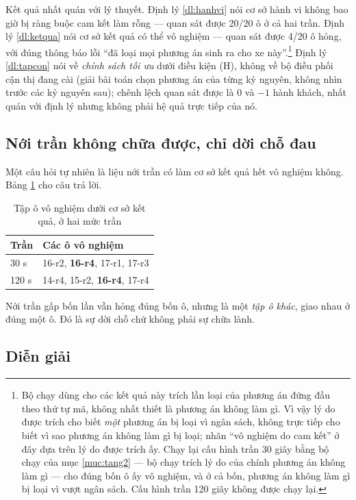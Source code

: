 Kết quả nhất quán với lý thuyết. Định lý \ref{dl:hanhvi} nói cơ sở hành vi không bao giờ bị
ràng buộc cam kết làm rỗng --- quan sát được 20/20 ô ở cả hai trần. Định lý \ref{dl:ketqua} nói
cơ sở kết quả có thể vô nghiệm --- quan sát được 4/20 ô hỏng, với đúng thông báo lỗi ``đã loại
mọi phương án sinh ra cho xe này''.\footnote{Bộ chạy dùng cho các kết quả này trích lần loại của
phương án đứng đầu theo thứ tự mã, không nhất thiết là phương án không làm gì. Vì vậy lý do được trích
cho biết \emph{một} phương án bị loại vì ngân sách, không trực tiếp cho biết vì sao phương án không
làm gì bị loại; nhãn ``vô nghiệm do cam kết'' ở đây dựa trên lý do được trích ấy. Chạy lại cấu hình
trần 30 giây bằng bộ chạy của mục \ref{muc:tang2} --- bộ chạy trích lý do của chính phương án không
làm gì --- cho đúng bốn ô ấy vô nghiệm, và ở cả bốn, phương án không làm gì bị loại vì vượt ngân sách.
Cấu hình trần 120 giây không được chạy lại.} Định lý \ref{dl:tapcon} nói về \emph{chính sách tối ưu} dưới
điều kiện (H), không về bộ điều phối cận thị đang cài (giải bài toán chọn phương án của từng kỷ
nguyên, không nhìn trước các kỷ nguyên sau); chênh lệch quan sát được là 0 và $-1$ hành
khách, nhất quán với định lý nhưng không phải hệ quả trực tiếp của nó.

\subsection{Nới trần không chữa được, chỉ dời chỗ đau}

Một câu hỏi tự nhiên là liệu nới trần có làm cơ sở kết quả hết vô nghiệm không. Bảng
\ref{bang:doicho} cho câu trả lời.

\begin{table}[htbp]
\centering
\caption{Tập ô vô nghiệm dưới cơ sở kết quả, ở hai mức trần}
\label{bang:doicho}
\small
\begin{tabular}{@{}ll@{}}
\toprule
\textbf{Trần} & \textbf{Các ô vô nghiệm}\\
\midrule
30 s & 16-r2, \textbf{16-r4}, 17-r1, 17-r3\\
120 s & 14-r4, 15-r2, \textbf{16-r4}, 17-r4\\
\bottomrule
\end{tabular}
\end{table}

Nới trần gấp bốn lần vẫn hỏng đúng bốn ô, nhưng là một \emph{tập ô khác}, giao nhau ở đúng một
ô. Đó là sự dời chỗ chứ không phải sự chữa lành.

\subsection{Diễn giải}

